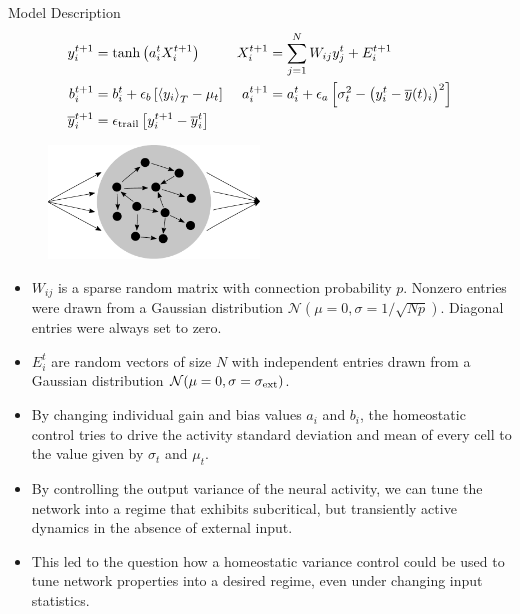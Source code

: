 \documentclass{beamer}
\newcommand{\avgt}[1]{\left< #1 \right>_T}
\begin{document}
\begin{frame}[t]
\begin{columns}[t]
\begin{column}{.4\textwidth}
\begin{myblock}{Model Description}
\vspace{-30pt}
\begin{align*}
y_i^{t+1} &= \mathrm{tanh}\left( a_i^t X_i^{t+1} \right) &
X_i^{t+1} &= \sum_{j=1}^{N} W_{ij} y_j^t + E_i^{t+1}  \\
b_i^{t+1} &= b_i^t + \epsilon_{b} \left[ \avgt{y_i} - \mu_{t} \right] &
a_i^{t+1} &= a_i^{t} + \epsilon_{a} \left[ \sigma_{t}^2 - \left( y_i^t - \overline{y}(t)_i\right)^2 \right]  \\
\overline{y}^{t+1}_i &= \epsilon_{\rm trail} \left[ y_i^{t+1} - \overline{y}^{t}_i\right]
\end{align*}
\begin{figure}
	\centering
	\includegraphics[width=0.5\textwidth]{../figures/illustration.pdf}
\end{figure}
\begin{itemize}
	\item $W_{ij}$ is a sparse random matrix with connection probability $p$. Nonzero entries were drawn from a Gaussian distribution $\mathcal{N}(\mu = 0,\sigma = 1/\sqrt{N p})$. Diagonal entries were always set to zero.
	\item $E^t_{i}$ are random vectors of size $N$ with independent entries drawn from a Gaussian distribution $\mathcal{N}(\mu = 0,\sigma = \sigma_{\rm ext})$.
	\item By changing individual gain and bias values $a_i$ and $b_i$, the homeostatic control tries to drive the activity standard deviation and mean of every cell to the value given by $\sigma_{t}$ and $\mu_{t}$.
	\item By controlling the output variance of the neural activity, we can tune the network into a regime that exhibits subcritical, but transiently active dynamics in the absence of external input.
	\item This led to the question how a homeostatic variance control could be used to tune network properties into a desired regime, even under changing input statistics. 
\end{itemize}
\end{myblock}


\end{column}
\end{columns}
\end{frame}
\end{document}
